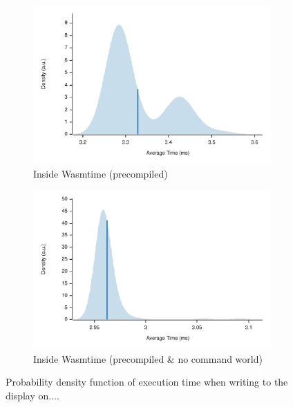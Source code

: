 \begin{figure}[h]
\begin{subfigure}{.5\textwidth}
  \centering
  \includegraphics[width=\linewidth]{figures/compiled_led}
  \caption{Inside Wasmtime (precompiled)}
  \label{fig:led:compiled}
\end{subfigure}%
\begin{subfigure}{.5\textwidth}
  \centering
  \includegraphics[width=\linewidth]{figures/optim_compiled_led}
  \caption{Inside Wasmtime (precompiled \& no command world)}
  \label{fig:led:wasmtime}
\end{subfigure}

\caption{Probability density function of execution time when writing to the display on....}
\label{fig:display}
\end{figure}

